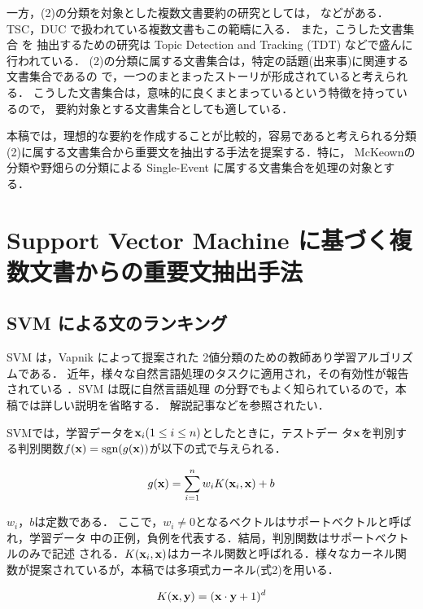 一方，(2)の分類を対象とした複数文書要約の研究としては，
\cite{article38,article39,article40}などがある．
TSC，DUC で扱われている複数文書もこの範疇に入る． また，こうした文書集合
を
抽出するための研究は Topic Detection and Tracking (TDT)\cite{article37}
などで盛んに行われている．
(2)の分類に属する文書集合は，特定の話題(出来事)に関連する文書集合であるの
で，一つのまとまったストーリが形成されていると考えられる．
こうした文書集合は，意味的に良くまとまっているという特徴を持っているので，
要約対象とする文書集合としても適している．

本稿では，理想的な要約を作成することが比較的，容易であると考えられる分類
(2)に属する文書集合から重要文を抽出する手法を提案する．特に，
McKeownの分類\cite{article51}や野畑らの分類\cite{article42}による
Single-Event に属する文書集合を処理の対象とする．

\section{Support Vector Machine に基づく複数文書からの重要文抽出手法}

\subsection{SVM による文のランキング}

SVM は，Vapnik によって提案された
2値分類のための教師あり学習アルゴリズムである\cite{article12}．
近年，様々な自然言語処理のタスクに適用され，その有効性が報告されている
\cite{article13,article14,article15,article16}．SVM は既に自然言語処理
の分野でもよく知られているので，本稿では詳しい説明を省略する．
解説記事\cite{article52}などを参照されたい．

SVMでは，学習データを${\bf x}_i(1 \le i \le n)$としたときに，テストデー
タ${\bf x}$を判別す
る判別関数$f({\bf x})={\rm sgn}(g({\bf x}))$が以下の式で与えられる．

\begin{equation}
 g({\bf x})  =    \sum_{i=1}^n w_i K ({\bf x}_i,{\bf x}) + b 
\end{equation}

$w_i$，$b$は定数である．
ここで，$w_i \ne 0$となるベクトルはサポートベクトルと呼ばれ，学習データ
中の正例，負例を代表する．結局，判別関数はサポートベクトルのみで記述
される．$K({\bf x}_i,{\bf x})$はカーネル関数と呼ばれる．様々なカーネル関
数が提案されているが，本稿では多項式カーネル(式2)を用いる．

\begin{equation}
 K({\bf x},{\bf y})  =   ({\bf x} \cdot {\bf y} +1)^d 
\end{equation}

